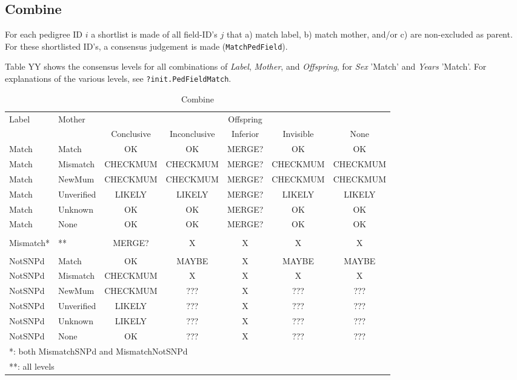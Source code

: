 \documentclass[a4paper, 12pt]{article}
\begin{document}
\subsection{Combine}
For each pedigree ID $i$ a shortlist is made of all field-ID's $j$ that a) match label, b) match mother, and/or c) are non-excluded as parent. For these shortlisted ID's, a consensus judgement is made (\verb+MatchPedField+).

Table YY shows the consensus levels for all combinations of \emph{Label}, \emph{Mother}, and \emph{Offspring}, for \emph{Sex} 'Match' and \emph{Years} 'Match'. For explanations of the various levels, see \verb+?init.PedFieldMatch+.

\begin{table}[tbp]
\caption{Combine}
	\centering  \footnotesize
		\begin{tabular}{ll|ccccc}
			\hline
Label & Mother & \multicolumn{5}{c}{Offspring}  \\
 &  & Conclusive & Inconclusive & Inferior & Invisible & None \\
\hline
Match & Match & OK & OK & MERGE? & OK & OK \\
Match & Mismatch & CHECKMUM & CHECKMUM & MERGE? & CHECKMUM & CHECKMUM \\
Match & NewMum & CHECKMUM & CHECKMUM & MERGE? & CHECKMUM & CHECKMUM \\
Match & Unverified & LIKELY & LIKELY & MERGE? & LIKELY & LIKELY \\
Match & Unknown & OK & OK & MERGE? & OK & OK \\
Match & None & OK & OK & MERGE? & OK & OK \\
& & & & & & \\
Mismatch* & ** & MERGE? & X & X & X & X \\
& & & & & & \\
NotSNPd & Match & OK & MAYBE & X & MAYBE & MAYBE \\
NotSNPd & Mismatch & CHECKMUM & X & X & X & X \\
NotSNPd & NewMum & CHECKMUM & ??? & X & ??? & ??? \\
NotSNPd & Unverified & LIKELY & ??? & X & ??? & ??? \\
NotSNPd & Unknown & LIKELY & ??? & X & ??? & ??? \\
NotSNPd & None & OK & ??? & X & ??? & ??? \\
\hline
\multicolumn{7}{l}{*\phantom{*}: both MismatchSNPd and MismatchNotSNPd} \\
\multicolumn{7}{l}{**: all levels} \\
		\end{tabular}
\end{table}
\end{document}
